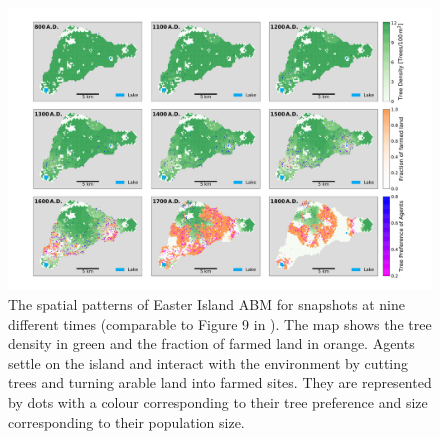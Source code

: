 \begin{figure}
	\centering
	\includegraphics[width=1.3\textwidth, center]{images/Results/Standard/Rull2020_Comparison_seed3}
	\caption{The spatial patterns of Easter Island ABM for snapshots at nine different times (comparable to Figure 9 in ). The map shows the tree density in green and the fraction of farmed land in orange. Agents settle on the island and interact with the environment by cutting trees and turning arable land into farmed sites. They are represented by dots with a colour corresponding to their tree preference and size corresponding to their population size.}
	\label{fig:STDrull}
\end{figure}



